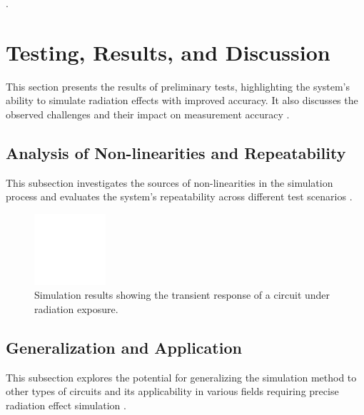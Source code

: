 \documentclass[conference]{IEEEtran}
\begin{document}
\cite{Massengill1984}.

\section{Testing, Results, and Discussion}
This section presents the results of preliminary tests, highlighting the system's ability to simulate radiation effects with improved accuracy. It also discusses the observed challenges and their impact on measurement accuracy \cite{Pepper1990}.

\subsection{Analysis of Non-linearities and Repeatability}
This subsection investigates the sources of non-linearities in the simulation process and evaluates the system's repeatability across different test scenarios \cite{Pepper1990}.

\begin{figure}[htbp]
\centering
\includegraphics[width=0.8\linewidth]{simulation_results_placeholder.png}
\caption{Simulation results showing the transient response of a circuit under radiation exposure.}
\label{fig:simulation_results}
\end{figure}

\subsection{Generalization and Application}
This subsection explores the potential for generalizing the simulation method to other types of circuits and its applicability in various fields requiring precise radiation effect simulation \cite{Pepper1990}.
\end{document}
